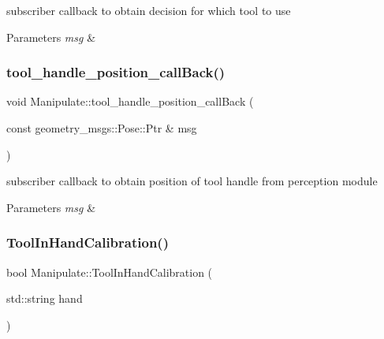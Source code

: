subscriber callback to obtain decision for which tool to use 


\begin{DoxyParams}{Parameters}
{\em msg} & \\
\hline
\end{DoxyParams}
\mbox{\label{structManipulate_abfa252d6d9085b184ba68156aac3d308}} 
\subsubsection{\texorpdfstring{tool\+\_\+handle\+\_\+position\+\_\+call\+Back()}{tool\_handle\_position\_callBack()}}
{\footnotesize\ttfamily void Manipulate\+::tool\+\_\+handle\+\_\+position\+\_\+call\+Back (\begin{DoxyParamCaption}\item[{const geometry\+\_\+msgs\+::\+Pose\+::\+Ptr \&}]{msg }\end{DoxyParamCaption})\hspace{0.3cm}{\ttfamily [private]}}



subscriber callback to obtain position of tool handle from perception module 


\begin{DoxyParams}{Parameters}
{\em msg} & \\
\hline
\end{DoxyParams}
\mbox{\label{structManipulate_a118cc711fca21f8b4db0ef16b5e40022}} 
\subsubsection{\texorpdfstring{Tool\+In\+Hand\+Calibration()}{ToolInHandCalibration()}}
{\footnotesize\ttfamily bool Manipulate\+::\+Tool\+In\+Hand\+Calibration (\begin{DoxyParamCaption}\item[{std\+::string}]{hand }\end{DoxyParamCaption})\hspace{0.3cm}{\ttfamily [private]}}



